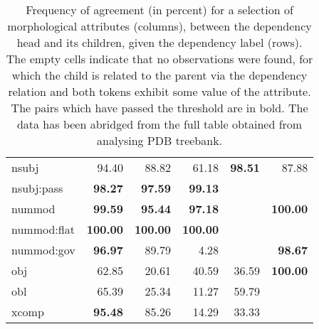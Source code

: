 \documentclass[12pt]{article}
\begin{document}
\begin{table}[H]
\begin{tabular}{lrrrrr}
nsubj       &   94.40 &   88.82 &   61.18 &   \textbf{98.51} &         87.88 \\
nsubj:pass  &   \textbf{98.27} &   \textbf{97.59} &   \textbf{99.13} &         &               \\  
nummod      &   \textbf{99.59} &   \textbf{95.44} &   \textbf{97.18} &         &        \textbf{100.00} \\
nummod:flat &  \textbf{100.00} &  \textbf{100.00} &  \textbf{100.00} &         &               \\  
nummod:gov  &   \textbf{96.97} &   89.79 &    4.28 &         &         \textbf{98.67} \\
obj         &   62.85 &   20.61 &   40.59 &   36.59 &        \textbf{100.00} \\
obl         &   65.39 &   25.34 &   11.27 &   59.79 &               \\  
xcomp       &   \textbf{95.48} &   85.26 &   14.29 &   33.33 &               \\  
\bottomrule
\end{tabular}
\caption{Frequency of agreement (in percent) for a selection of morphological attributes (columns), between the dependency head and its children, given the dependency label (rows). The empty cells indicate that no observations were found, for which the child is related to the parent via the dependency relation and both tokens exhibit some value of the attribute. The pairs which have passed the threshold are in bold. The data has been abridged from the full table obtained from analysing PDB treebank.}\label{tab:agreement_stats}
\end{table}
\end{document}
